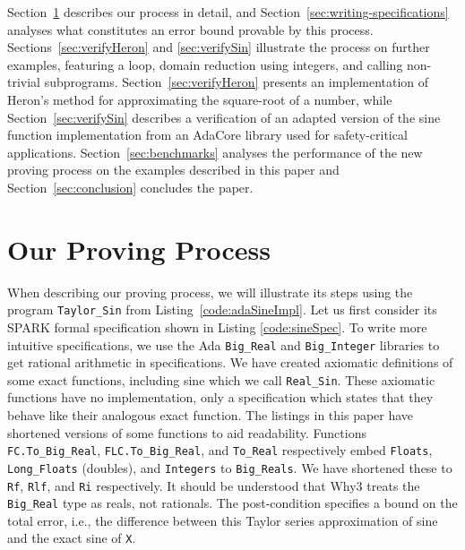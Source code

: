 \documentclass[runningheads]{llncs}
\begin{document}
Section~\ref{sec:provingProcess} describes our process in detail, and
Section~\ref{sec:writing-specifications} analyses what constitutes an error bound provable by this process.
Sections~\ref{sec:verifyHeron} and \ref{sec:verifySin} illustrate the process on further examples, featuring a loop, domain reduction using integers, and calling non-trivial subprograms.
Section~\ref{sec:verifyHeron} presents an implementation of Heron's method for approximating the square-root of a number, while
Section~\ref{sec:verifySin} describes a verification of an adapted version of the sine function implementation from an AdaCore library used for safety-critical applications.
Section~\ref{sec:benchmarks} analyses the performance of the new proving process on the examples described in this paper and Section~\ref{sec:conclusion} concludes the paper.
%
%
%


\section{Our Proving Process}\label{sec:provingProcess}

When describing our proving process, we will illustrate its steps using the program \lstinline{Taylor_Sin} from Listing~\ref{code:adaSineImpl}.
Let us first consider its SPARK formal specification
shown in Listing \ref{code:sineSpec}.
To write more intuitive specifications, we use the Ada \lstinline{Big_Real} and \lstinline{Big_Integer} libraries to get rational arithmetic in specifications.
We have created axiomatic definitions of some exact functions, including sine which we call \lstinline{Real_Sin}.
These axiomatic functions have no implementation, only a specification which states that they behave like their analogous exact function.
The listings in this paper have shortened versions of some functions to aid readability.
Functions \lstinline{FC.To_Big_Real}, \lstinline{FLC.To_Big_Real}, and \lstinline{To_Real} respectively embed \lstinline{Floats}, \lstinline{Long_Floats} (doubles), and \lstinline{Integers} to \lstinline{Big_Reals}.
We have shortened these to \lstinline{Rf}, \lstinline{Rlf}, and \lstinline{Ri} respectively.
It should be understood that Why3 treats the \lstinline{Big_Real} type as reals, not rationals. 
The post-condition specifies a bound on the total error, i.e., the difference between this Taylor series approximation of sine and the exact sine of \lstinline{X}.
\end{document}
